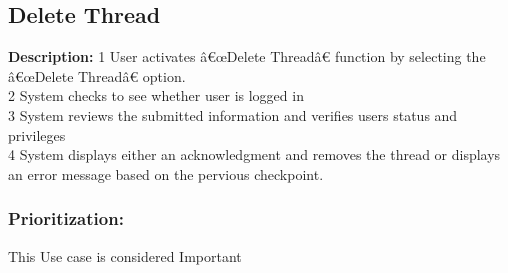 \documentclass[a4paper,11pt]{article}
\begin{document}
\subsection{Delete Thread}
\textbf{Description:}
1	User activates â€œDelete Threadâ€ function by selecting the â€œDelete Threadâ€ option.\\
2	System checks to see whether user is logged in\\
3	System reviews the submitted information and  verifies users status and privileges\\
4	System displays either an acknowledgment and removes the thread or displays an error message based on the pervious checkpoint.\\
\subsubsection{Prioritization:} 
This Use case is considered Important\\
\end{document}
